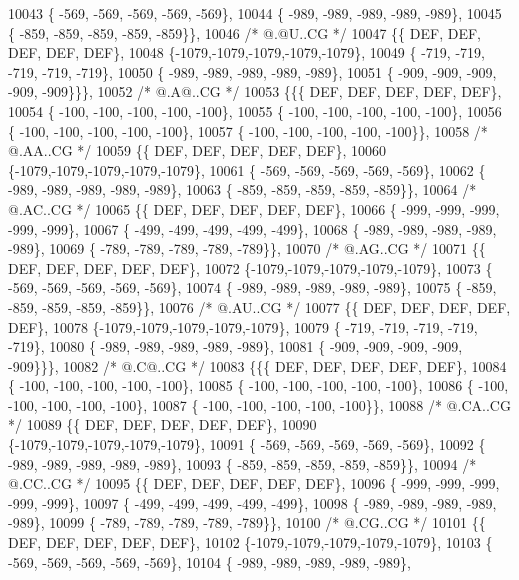 \begin{DoxyCode}
10043 \{ -569, -569, -569, -569, -569\},
10044 \{ -989, -989, -989, -989, -989\},
10045 \{ -859, -859, -859, -859, -859\}\},
10046 \textcolor{comment}{/*  @.@U..CG */}
10047 \{\{  DEF,  DEF,  DEF,  DEF,  DEF\},
10048 \{-1079,-1079,-1079,-1079,-1079\},
10049 \{ -719, -719, -719, -719, -719\},
10050 \{ -989, -989, -989, -989, -989\},
10051 \{ -909, -909, -909, -909, -909\}\}\},
10052 \textcolor{comment}{/*  @.A@..CG */}
10053 \{\{\{  DEF,  DEF,  DEF,  DEF,  DEF\},
10054 \{ -100, -100, -100, -100, -100\},
10055 \{ -100, -100, -100, -100, -100\},
10056 \{ -100, -100, -100, -100, -100\},
10057 \{ -100, -100, -100, -100, -100\}\},
10058 \textcolor{comment}{/*  @.AA..CG */}
10059 \{\{  DEF,  DEF,  DEF,  DEF,  DEF\},
10060 \{-1079,-1079,-1079,-1079,-1079\},
10061 \{ -569, -569, -569, -569, -569\},
10062 \{ -989, -989, -989, -989, -989\},
10063 \{ -859, -859, -859, -859, -859\}\},
10064 \textcolor{comment}{/*  @.AC..CG */}
10065 \{\{  DEF,  DEF,  DEF,  DEF,  DEF\},
10066 \{ -999, -999, -999, -999, -999\},
10067 \{ -499, -499, -499, -499, -499\},
10068 \{ -989, -989, -989, -989, -989\},
10069 \{ -789, -789, -789, -789, -789\}\},
10070 \textcolor{comment}{/*  @.AG..CG */}
10071 \{\{  DEF,  DEF,  DEF,  DEF,  DEF\},
10072 \{-1079,-1079,-1079,-1079,-1079\},
10073 \{ -569, -569, -569, -569, -569\},
10074 \{ -989, -989, -989, -989, -989\},
10075 \{ -859, -859, -859, -859, -859\}\},
10076 \textcolor{comment}{/*  @.AU..CG */}
10077 \{\{  DEF,  DEF,  DEF,  DEF,  DEF\},
10078 \{-1079,-1079,-1079,-1079,-1079\},
10079 \{ -719, -719, -719, -719, -719\},
10080 \{ -989, -989, -989, -989, -989\},
10081 \{ -909, -909, -909, -909, -909\}\}\},
10082 \textcolor{comment}{/*  @.C@..CG */}
10083 \{\{\{  DEF,  DEF,  DEF,  DEF,  DEF\},
10084 \{ -100, -100, -100, -100, -100\},
10085 \{ -100, -100, -100, -100, -100\},
10086 \{ -100, -100, -100, -100, -100\},
10087 \{ -100, -100, -100, -100, -100\}\},
10088 \textcolor{comment}{/*  @.CA..CG */}
10089 \{\{  DEF,  DEF,  DEF,  DEF,  DEF\},
10090 \{-1079,-1079,-1079,-1079,-1079\},
10091 \{ -569, -569, -569, -569, -569\},
10092 \{ -989, -989, -989, -989, -989\},
10093 \{ -859, -859, -859, -859, -859\}\},
10094 \textcolor{comment}{/*  @.CC..CG */}
10095 \{\{  DEF,  DEF,  DEF,  DEF,  DEF\},
10096 \{ -999, -999, -999, -999, -999\},
10097 \{ -499, -499, -499, -499, -499\},
10098 \{ -989, -989, -989, -989, -989\},
10099 \{ -789, -789, -789, -789, -789\}\},
10100 \textcolor{comment}{/*  @.CG..CG */}
10101 \{\{  DEF,  DEF,  DEF,  DEF,  DEF\},
10102 \{-1079,-1079,-1079,-1079,-1079\},
10103 \{ -569, -569, -569, -569, -569\},
10104 \{ -989, -989, -989, -989, -989\},

\end{DoxyCode}
